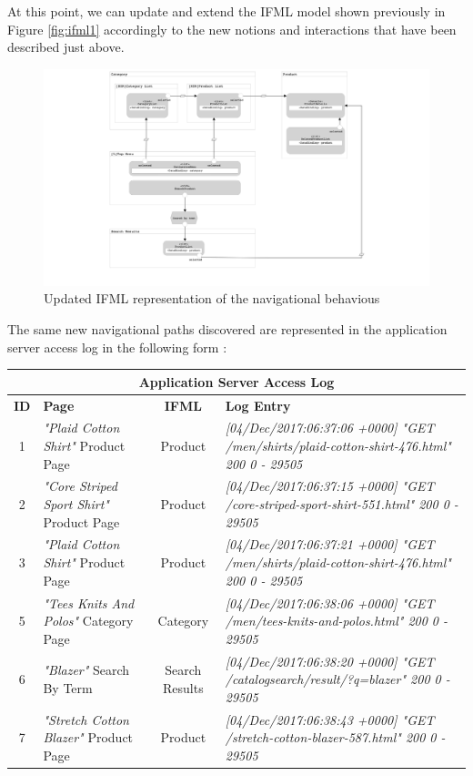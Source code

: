 At this point, we can update and extend the IFML model shown previously in Figure \ref{fig:ifml1} accordingly to the new notions and interactions that have been described just above.

\vspace{0.5cm}
\begin{figure}[H]
  \centering
    \includegraphics[width=16cm]{images/madison/ifml2.png}
  \caption{Updated IFML representation of the navigational behavious}
  \label{fig:ifml2}
\end{figure}
\vspace{0.5cm}

The same new navigational paths discovered are represented in the application server access log in the following form : 

\vspace{0.5cm}
\begin{center}
  \begin{tabular}{|c|p{3cm}|c|p{6cm}|}
  \hline
  \multicolumn{4}{|c|}{Application Server Access Log}\\ \hline
  \textbf{ID}&\textbf{Page}&\textbf{IFML}&\textbf{Log Entry}   \\ \hline
  1&\textit{"Plaid Cotton Shirt"} Product Page&Product&\em[04/Dec/2017:06:37:06 +0000] 
  "GET /men/shirts/plaid-cotton-shirt-476.html" 200 0 - 29505
  \\ \hline
  2&\textit{"Core Striped Sport Shirt"} Product Page &Product&\em [04/Dec/2017:06:37:15 +0000] "GET /core-striped-sport-shirt-551.html" 200 0 - 29505
  \\ \hline
  3&\textit{"Plaid Cotton Shirt"} Product Page &Product&\em[04/Dec/2017:06:37:21 +0000] "GET /men/shirts/plaid-cotton-shirt-476.html" 200 0 - 29505
  \\ \hline
  5&\textit{"Tees Knits And Polos"} Category Page &Category&\em[04/Dec/2017:06:38:06 +0000] "GET /men/tees-knits-and-polos.html" 200 0 - 29505
  \\ \hline
  6&\textit{"Blazer"} Search By Term&Search Results&\em[04/Dec/2017:06:38:20 +0000] "GET /catalogsearch/result/?q=blazer" 200 0 - 29505
  \\ \hline
  7&\textit{"Stretch Cotton Blazer"} Product Page &Product&\em[04/Dec/2017:06:38:43 +0000] "GET /stretch-cotton-blazer-587.html" 200 0 - 29505
  \\ \hline
  \end{tabular}
  \end{center}
\vspace{0.5cm}

